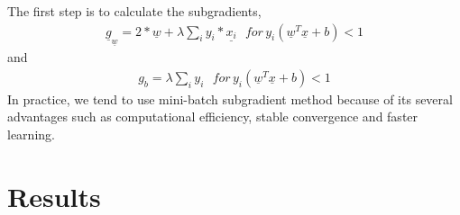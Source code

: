 \documentclass[twoside,twocolumn]{article}
\renewcommand{\vec}[1]{\underline{#1}}
\newcommand\fourspace{\,\,\,\,}
\begin{document}
The first step is to calculate the subgradients, 
\begin{align}
    \vec{g}_{\vec{w}} = 2*\vec{w}+\lambda\displaystyle\sum_i y_i*\vec{x_i} \fourspace for\,  y_i\left(\vec{w}^T\vec{x}+b\right) < 1
\end{align}
and
\begin{align}
    g_{b} = \lambda\displaystyle\sum_i y_i \fourspace for\,  y_i\left(\vec{w}^T\vec{x}+b\right) < 1
\end{align}
\cite{boyd2008stochastic}In practice, we tend to use mini-batch subgradient method because of its several advantages such as computational efficiency, stable convergence and faster learning.

\section{Results}
\end{document}
